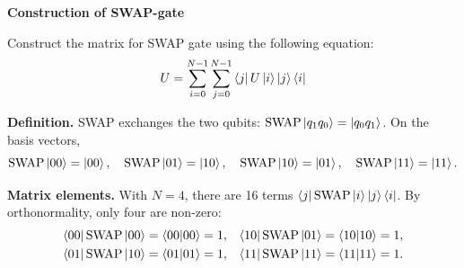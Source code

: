 \documentclass[a4paper, 10pt]{article}
\begin{document}
\begin{problem}
\textbf{Construction of SWAP-gate}
\par Construct the matrix for SWAP gate using the following equation:
\[
	U = \sum_{i = 0}^{N - 1} \sum_{j = 0}^{N - 1} \bra{j} U \ket{i} \ket{j} \bra{i}
\]
\end{problem}

\begin{solution}
	\noindent \textbf{Definition.} SWAP exchanges the two qubits: \( \mathrm{SWAP}\ket{q_1 q_0} = \ket{q_0 q_1} \). On the basis vectors,
	\[
		\mathrm{SWAP}\ket{00} = \ket{00}, \quad \mathrm{SWAP}\ket{01} = \ket{10}, \quad \mathrm{SWAP}\ket{10} = \ket{01}, \quad \mathrm{SWAP}\ket{11} = \ket{11}.
	\]

	\noindent \textbf{Matrix elements.} With \( N = 4 \), there are 16 terms \( \bra{j}\mathrm{SWAP}\ket{i}\ket{j}\bra{i} \). By orthonormality, only four are non-zero:
	\begin{align*}
		\bra{00}\mathrm{SWAP}\ket{00} & = \braket{00 \vert 00} = 1, & \bra{10}\mathrm{SWAP}\ket{01} & = \braket{10 \vert 10} = 1,  \\
		\bra{01}\mathrm{SWAP}\ket{10} & = \braket{01 \vert 01} = 1, & \bra{11}\mathrm{SWAP}\ket{11} & = \braket{11 \vert 11} = 1 .
	\end{align*}


\end{solution}
\end{document}
